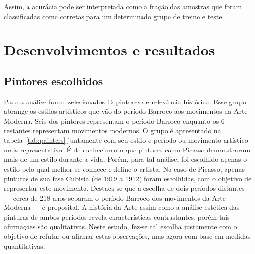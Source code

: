 Assim, a acurácia pode ser interpretada como a fração das amostras que
foram classificadas como corretas para um determinado grupo de treino
e teste.


\afterpage{\blankpage}
\chapter{Desenvolvimentos e resultados}
\label{chap:resultados}


\section{Pintores escolhidos}

Para a análise foram selecionados 12 pintores de relevância
histórica. Esse grupo abrange os estilos artísticos que vão do período
Barroco aos movimentos da Arte Moderna. Seis dos pintores representam
o período Barroco enquanto os 6 restantes representam movimentos modernos. O grupo é apresentado na tabela~\ref{tab:painters}
juntamente com seu estilo e período ou movimento artístico mais
representativo. É de conhecimento que pintores como Picasso
demonstraram mais de um estilo durante a vida. Porém, para tal
análise, foi escolhido apenas o estilo pelo qual melhor se conhece e
define o artista. No caso de Picasso, apenas pinturas de sua fase
Cubista (de 1909 a 1912) foram escolhidas, com o objetivo de
representar este movimento. Destaca-se que a escolha de dois períodos
distantes --- cerca de 218 anos separam o período Barroco dos
movimentos da Arte Moderna --- é proposital. A história da Arte assim
como a análise estética das pinturas de ambos períodos revela
características contrastantes, porém tais afirmações são
qualitativas. Neste estudo, fez-se tal escolha justamente com o
objetivo de refutar ou afirmar estas observações, mas agora com base
em medidas quantitativas.


